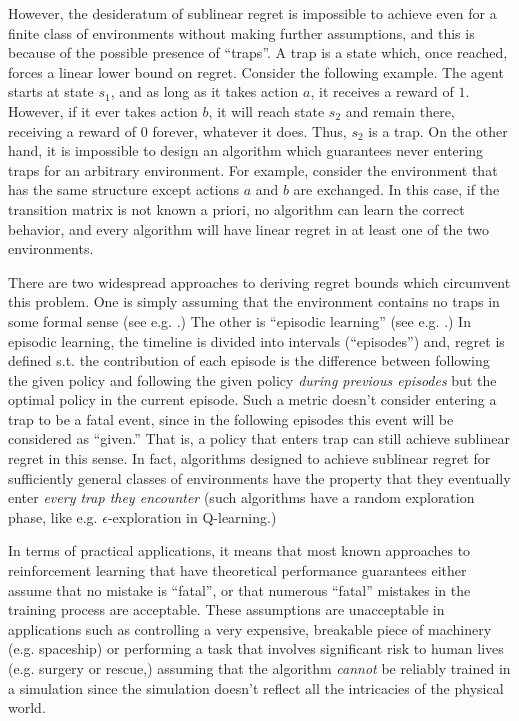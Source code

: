 \documentclass[anon,12pt]{colt2018} %
\begin{document}
However, the desideratum of sublinear regret is impossible to achieve even for a finite class of environments without making further assumptions, and this is because of the possible presence of \enquote{traps}. A trap is a state which, once reached, forces a linear lower bound on regret. Consider the following example. The agent starts at state $s_1$, and as long as it takes action $a$, it receives a reward of $1$. However, if it ever takes action $b$, it will reach state $s_2$ and remain there, receiving a reward of $0$ forever, whatever it does. Thus, $s_2$ is a trap. On the other hand, it is impossible to design an algorithm which guarantees never entering traps for an arbitrary environment. For example, consider the environment that has the same structure except actions $a$ and $b$ are exchanged. In this case, if the transition matrix is not known a priori, no algorithm can learn the correct behavior, and every algorithm will have linear regret in at least one of the two environments.

There are two widespread approaches to deriving regret bounds which circumvent this problem. One is simply assuming that the environment contains no traps in some formal sense (see e.g. \cite{Nguyen2013}.) The other is \enquote{episodic learning} (see e.g. \cite{Osband2014}.) In episodic learning, the timeline is divided into intervals (\enquote{episodes}) and, regret is defined s.t. the contribution of each episode is the difference between following the given policy and following the given policy \emph{during previous episodes} but the optimal policy in the current episode. Such a metric doesn't consider entering a trap to be a fatal event, since in the following episodes this event will be considered as \enquote{given.} That is, a policy that enters trap can still achieve sublinear regret in this sense. In fact, algorithms designed to achieve sublinear regret for sufficiently general classes of environments have the property that they eventually enter \emph{every trap they encounter} (such algorithms have a random exploration phase, like e.g. $\epsilon$-exploration in Q-learning.)

In terms of practical applications, it means that most known approaches to reinforcement learning that have theoretical performance guarantees either assume that no mistake is \enquote{fatal}, or that numerous \enquote{fatal} mistakes in the training process are acceptable. These assumptions are unacceptable in applications such as controlling a very expensive, breakable piece of machinery (e.g. spaceship) or performing a task that involves significant risk to human lives (e.g. surgery or rescue,) assuming that the algorithm \emph{cannot} be reliably trained in a simulation since the simulation doesn't reflect all the intricacies of the physical world.
\end{document}

